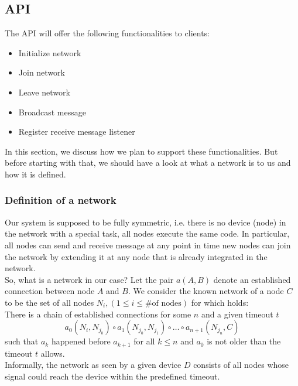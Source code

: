 \subsection{API}
	The API will offer the following functionalities to clients:
	\begin{itemize}
		\item {Initialize network}
		\item {Join network}
		\item {Leave network}
		\item {Broadcast message}
		\item {Register receive message listener}
	\end{itemize}
	
	In this section, we discuss how we plan to support these functionalities. But before starting with that, we should have a look at	what a network is to us and how it is defined.\\
	\subsubsection{Definition of a network}
	Our system is supposed to be fully symmetric, i.e. there is no device (node) in the network with a special task, all nodes execute the same code. In particular, all nodes can send and receive message at any point in time new nodes can join the network by extending it at any node that is already integrated in the network.\\
	So, what is a network in our case? Let the pair $a(A,B)$ denote an established connection between node $A$ and $B$. We consider the known network of a node $C$ to be the set of all nodes $N_i, (1 \leq i \leq \text{\# of nodes})$ for which holds:  \\
	There is a chain of established connections for some $n$ and a given timeout $t$
	\begin{displaymath}
		a_0(N_{i},N_{j_0}) \circ a_1(N_{j_0},N_{j_1}) \circ \ldots \circ a_{n+1}(N_{j_n},C)
	\end{displaymath}
	such that $a_k$ happened before $a_{k+1}$ for all $k \leq n$ and $a_0$ is not older than the timeout $t$ allows. \\
	Informally, the network as seen by a given device $D$ consists of all nodes whose signal could reach the device within the predefined timeout. \\ 
	
